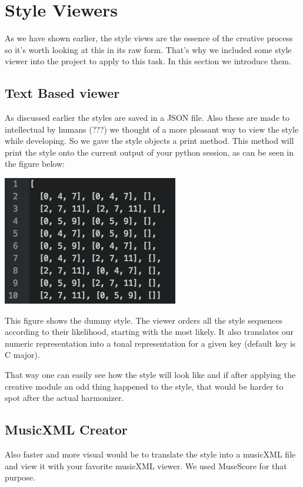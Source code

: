 \section{Style Viewers} 
\label{sec:viewers}
As we have shown earlier, the style views are the essence of the creative process so it's worth looking at this in its raw form. That's why we included some style viewer into the project to apply to this task. In this section we introduce them.

\subsection{Text Based viewer}
\label{sec:viewers.text}
As discussed earlier the styles are saved in a JSON file. Also these are made to intellectual by humans (???) we thought of a more pleasant way to view the style while developing. So we gave the style objects a print method. This method will print the style onto the current output of your python session, as can be seen in the figure below:

\includegraphics[scale=1]{Chapters/pic/text_print.png}

This figure shows the dummy style. The viewer orders all the style sequences according to their likelihood, starting with the most likely.  It also translates our numeric representation into a tonal representation for a given key (default key is C major).

That way one can easily see how the style will look like and if after applying the creative module an odd thing happened to the style, that would be harder to spot after the actual harmonizer. 

\subsection{MusicXML Creator}
\label{sec:viewers.musicxml}
Also faster and more visual would be to translate the style into a musicXML file and view it with your favorite musicXML viewer. We used MuseScore for that purpose. 

